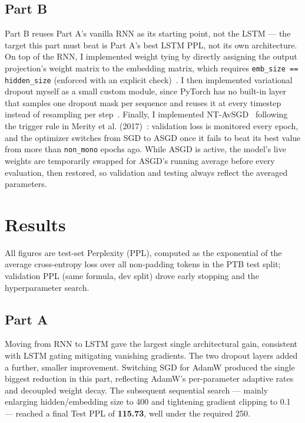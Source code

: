 \documentclass[a4paper]{article}
\begin{document}
\subsection{Part B}

Part B reuses Part A's vanilla RNN as its starting point, not the LSTM --- the target this part must beat is Part A's best LSTM PPL, not its own architecture. On top of the RNN, I implemented weight tying by directly assigning the output projection's weight matrix to the embedding matrix, which requires \texttt{emb\_size == hidden\_size} (enforced with an explicit check)~\cite{press2017using}. I then implemented variational dropout myself as a small custom module, since PyTorch has no built-in layer that samples one dropout mask per sequence and reuses it at every timestep instead of resampling per step~\cite{gal2016theoretically}. Finally, I implemented NT-AvSGD~\cite{asgd_docs} following the trigger rule in Merity et al. (2017)~\cite{merity2018regularizing}: validation loss is monitored every epoch, and the optimizer switches from SGD to ASGD once it fails to beat its best value from more than \texttt{non\_mono} epochs ago. While ASGD is active, the model's live weights are temporarily swapped for ASGD's running average before every evaluation, then restored, so validation and testing always reflect the averaged parameters.

\section{Results}

All figures are test-set Perplexity (PPL), computed as the exponential of the average cross-entropy loss over all non-padding tokens in the PTB test split; validation PPL (same formula, dev split) drove early stopping and the hyperparameter search.

\subsection{Part A}

Moving from RNN to LSTM gave the largest single architectural gain, consistent with LSTM gating mitigating vanishing gradients. The two dropout layers added a further, smaller improvement. Switching SGD for AdamW produced the single biggest reduction in this part, reflecting AdamW's per-parameter adaptive rates and decoupled weight decay. The subsequent sequential search --- mainly enlarging hidden/embedding size to 400 and tightening gradient clipping to 0.1 --- reached a final Test PPL of \textbf{115.73}, well under the required 250.
\end{document}
